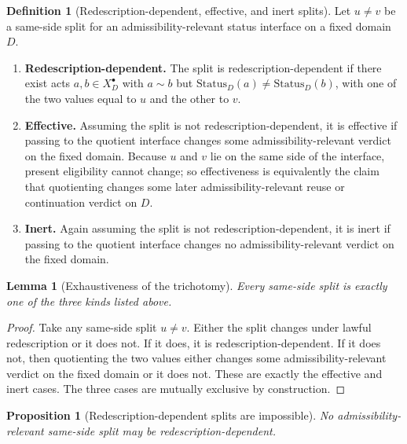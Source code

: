 \documentclass[11pt]{article}
\theoremstyle{plain}
\newtheorem{proposition}[theorem]{Proposition}
\newtheorem{lemma}[theorem]{Lemma}
\theoremstyle{definition}
\newtheorem{definition}[theorem]{Definition}
\newcommand{\Law}{\sim}
\newcommand{\Eval}{X_D^{\bullet}}
\newcommand{\domain}{D}
\begin{document}
\begin{definition}[Redescription-dependent, effective, and inert splits]
Let $u\neq v$ be a same-side split for an admissibility-relevant status interface on a fixed domain $\domain$.
\begin{enumerate}[label=(T\arabic*), leftmargin=2.8em]
    \item \textbf{Redescription-dependent.} The split is redescription-dependent if there exist acts $a,b\in\Eval$ with $a\Law b$ but $\mathrm{Status}_\domain(a)\neq \mathrm{Status}_\domain(b)$, with one of the two values equal to $u$ and the other to $v$.
    \item \textbf{Effective.} Assuming the split is not redescription-dependent, it is effective if passing to the quotient interface changes some admissibility-relevant verdict on the fixed domain. Because $u$ and $v$ lie on the same side of the interface, present eligibility cannot change; so effectiveness is equivalently the claim that quotienting changes some later admissibility-relevant reuse or continuation verdict on $\domain$.
    \item \textbf{Inert.} Again assuming the split is not redescription-dependent, it is inert if passing to the quotient interface changes no admissibility-relevant verdict on the fixed domain.
\end{enumerate}
\end{definition}

\begin{lemma}[Exhaustiveness of the trichotomy]
\label{lem:B-trichotomy}
Every same-side split is exactly one of the three kinds listed above.
\end{lemma}

\begin{proof}
Take any same-side split $u\neq v$. Either the split changes under lawful redescription or it does not. If it does, it is redescription-dependent. If it does not, then quotienting the two values either changes some admissibility-relevant verdict on the fixed domain or it does not. These are exactly the effective and inert cases. The three cases are mutually exclusive by construction.
\end{proof}

\begin{proposition}[Redescription-dependent splits are impossible]
\label{prop:B-no-redescription-split}
No admissibility-relevant same-side split may be redescription-dependent.
\end{proposition}
\end{document}
